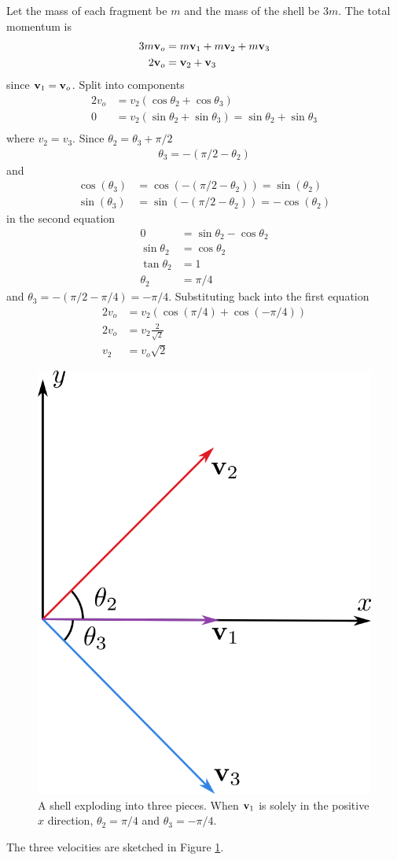 \documentclass[../problems.tex]{subfiles}
\begin{document}
Let the mass of each fragment be $m$ and the mass of the shell be $3m$. The total momentum is
\begin{align*}
    3m\vb{v}_o &= m\vb{v}_1 + m\vb{v}_2 + m\vb{v}_3 \\
    2\vb{v}_o &= \vb{v}_2 + \vb{v}_3 \\
\end{align*}
since $\vb{v}_1 = \vb{v}_o$. Split into components
\begin{align*}
    2v_o &= v_2(\cos{\theta_2} + \cos{\theta_3}) \\
    0 &= v_2(\sin{\theta_2} + \sin{\theta_3}) = \sin{\theta_2} + \sin{\theta_3} \\
\end{align*}
where $v_2=v_3$. Since $\theta_2=\theta_3+\pi/2$
\begin{align*}
    \theta_3 = -(\pi/2 - \theta_2)
\end{align*}
and
\begin{align*}
    \cos(\theta_3) &= \cos(-(\pi/2 - \theta_2)) = \sin(\theta_2) \\
    \sin(\theta_3) &= \sin(-(\pi/2 - \theta_2)) = -\cos(\theta_2)
\end{align*}
in the second equation
\begin{align*}
    0 &= \sin{\theta_2} - \cos{\theta_2} \\
    \sin{\theta_2} &= \cos{\theta_2} \\
    \tan{\theta_2} &= 1 \\
    \theta_2 &= \pi/4
\end{align*}
and $\theta_3 = -(\pi/2 - \pi/4) = -\pi/4$. Substituting back into the first equation
\begin{align*}
    2v_o &= v_2 (\cos(\pi/4) + \cos(-\pi/4)) \\
    2v_o &= v_2 \frac{2}{\sqrt{2}} \\
    v_2 &= v_o\sqrt{2}
\end{align*}
\begin{figure}[ht]
    \centering
    \includegraphics[width=0.3\linewidth]{../images/fig3_3.png}
    \captionsetup{width=0.7\linewidth}
    \caption{A shell exploding into three pieces. When $\vb{v}_1$ is solely in the positive
    $x$ direction, $\theta_2 = \pi/4$ and $\theta_3 = -\pi/4$.}
    \label{fig:3_3}
\end{figure}
The three velocities are sketched in Figure \ref{fig:3_3}.
\end{document}
